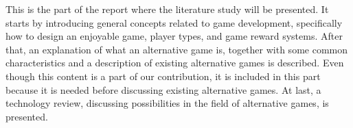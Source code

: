 This is the part of the report where the literature study will be presented. It starts by introducing general concepts related to game development, specifically how to design an enjoyable game, player types, and game reward systems. After that, an explanation of what an alternative game is, together with some common characteristics and a description of existing alternative games is described. Even though this content is a part of our contribution, it is included in this part because it is needed before discussing existing alternative games. At last, a technology review, discussing possibilities in the field of alternative games, is presented.
\clearpage


\clearpage


\clearpage


\clearpage


\clearpage


\clearpage


\clearpage


\clearpage